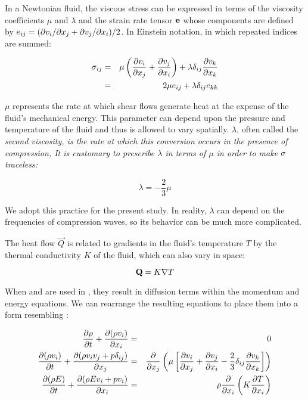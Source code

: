 In a Newtonian fluid, the viscous stress can be expressed in terms of the 
viscosity coefficients $\mu$ and $\lambda$ and the strain rate tensor 
$\mathbf{e}$ whose components are defined by $e_{ij} = (\partial v_i/\partial x_j + \partial v_j/\partial x_i)/2$\cite{Bachelor}. 
In Einstein notation, in which repeated indices are summed:

\begin{eqnarray}
\sigma_{ij} &=& \mu\left(\frac{\partial v_i}{\partial x_j} + \frac{\partial v_j}{\partial x_i}\right) + \lambda \delta_{ij} \frac{\partial v_k}{\partial x_k} \notag \\
         &=& 2\mu e_{ij} + \lambda \delta_{ij} e_{kk} \label{eq:viscTensor}
\end{eqnarray}

\noindent
$\mu$ represents the rate at which shear flows generate heat at the expense of 
the fluid's mechanical energy. This parameter can depend upon the pressure 
and temperature of the fluid and thus is allowed to vary spatially. $\lambda$,
often called the \em second viscosity\em, is the rate at which this conversion 
occurs in the presence of compression, It is customary to prescribe 
$\lambda$ in terms of $\mu$ in order to make $\mathbf{\sigma}$ traceless:

\begin{equation}
\lambda = -\frac{2}{3}\mu \label{eq:lambda}
\end{equation}

\noindent
We adopt this practice for the present study. In reality, $\lambda$ can depend 
on the frequencies of compression waves, so its behavior can be much more 
complicated\cite{LandauFM}.

The heat flow $\vec{Q}$ is related to gradients in the fluid's temperature $T$ 
by the thermal conductivity $K$ of the fluid, which can also vary in space:

\begin{equation}
\mathbf{Q} = K \nabla{T} \label{eq:heatFlow}
\end{equation}

When  and  are used in , they 
result in diffusion terms within the momentum and energy equations. 
We can rearrange the resulting equations to place them into a form resembling 
:

\begin{eqnarray}
\frac{\partial \rho}{\partial t} + \frac{\partial (\rho v_i)}{\partial x_i} &=& 0 \label{eq:continuity} \\
\frac{\partial (\rho v_i)}{\partial t} + \frac{\partial (\rho v_i v_j + p\delta_{ij})}{\partial x_j} &=& 
   \frac{\partial }{\partial x_j}\left(\mu\left[\frac{\partial v_i}{\partial x_j} + \frac{\partial v_j}{\partial x_i} - \frac{2}{3}\delta_{ij}\frac{\partial v_k}{\partial x_k}\right]\right) \label{eq:momentum} \\
\frac{\partial (\rho E)}{\partial t} + \frac{\partial (\rho E v_i + p v_i)}{\partial x_i} &=& \rho\frac{\partial }{\partial x_i}\left(K\frac{\partial T}{\partial x_i}\right) \label{eq:energy} 
\end{eqnarray}

